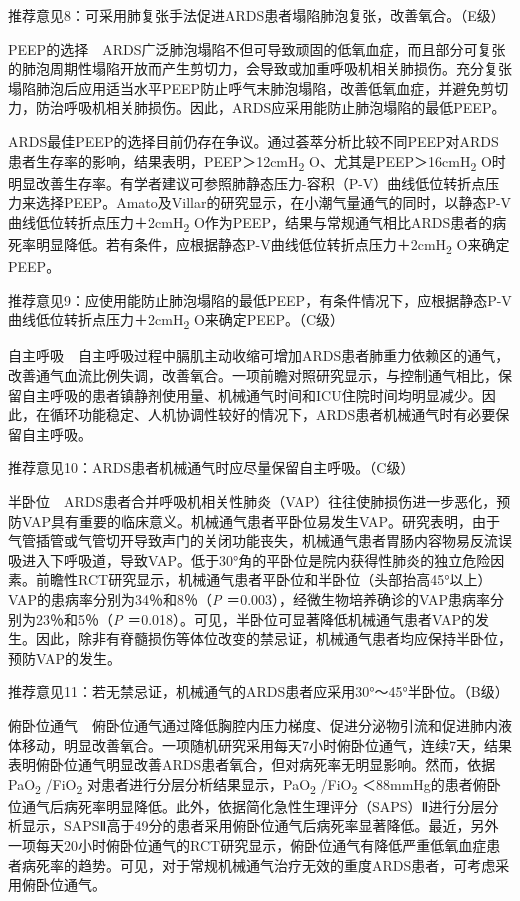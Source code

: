 推荐意见8：可采用肺复张手法促进ARDS患者塌陷肺泡复张，改善氧合。（E级）

PEEP的选择　ARDS广泛肺泡塌陷不但可导致顽固的低氧血症，而且部分可复张的肺泡周期性塌陷开放而产生剪切力，会导致或加重呼吸机相关肺损伤。充分复张塌陷肺泡后应用适当水平PEEP防止呼气末肺泡塌陷，改善低氧血症，并避免剪切力，防治呼吸机相关肺损伤。因此，ARDS应采用能防止肺泡塌陷的最低PEEP。

ARDS最佳PEEP的选择目前仍存在争议。通过荟萃分析比较不同PEEP对ARDS患者生存率的影响，结果表明，PEEP＞12cmH\textsubscript{2}
O、尤其是PEEP＞16cmH\textsubscript{2}
O时明显改善生存率。有学者建议可参照肺静态压力-容积（P-V）曲线低位转折点压力来选择PEEP。Amato及Villar的研究显示，在小潮气量通气的同时，以静态P-V曲线低位转折点压力＋2cmH\textsubscript{2}
O作为PEEP，结果与常规通气相比ARDS患者的病死率明显降低。若有条件，应根据静态P-V曲线低位转折点压力＋2cmH\textsubscript{2}
O来确定PEEP。

推荐意见9：应使用能防止肺泡塌陷的最低PEEP，有条件情况下，应根据静态P-V曲线低位转折点压力＋2cmH\textsubscript{2}
O来确定PEEP。（C级）

自主呼吸　自主呼吸过程中膈肌主动收缩可增加ARDS患者肺重力依赖区的通气，改善通气血流比例失调，改善氧合。一项前瞻对照研究显示，与控制通气相比，保留自主呼吸的患者镇静剂使用量、机械通气时间和ICU住院时间均明显减少。因此，在循环功能稳定、人机协调性较好的情况下，ARDS患者机械通气时有必要保留自主呼吸。

推荐意见10：ARDS患者机械通气时应尽量保留自主呼吸。（C级）

半卧位　ARDS患者合并呼吸机相关性肺炎（VAP）往往使肺损伤进一步恶化，预防VAP具有重要的临床意义。机械通气患者平卧位易发生VAP。研究表明，由于气管插管或气管切开导致声门的关闭功能丧失，机械通气患者胃肠内容物易反流误吸进入下呼吸道，导致VAP。低于30°角的平卧位是院内获得性肺炎的独立危险因素。前瞻性RCT研究显示，机械通气患者平卧位和半卧位（头部抬高45°以上）VAP的患病率分别为34％和8％（\emph{P}
＝0.003），经微生物培养确诊的VAP患病率分别为23％和5％（\emph{P}
＝0.018）。可见，半卧位可显著降低机械通气患者VAP的发生。因此，除非有脊髓损伤等体位改变的禁忌证，机械通气患者均应保持半卧位，预防VAP的发生。

推荐意见11：若无禁忌证，机械通气的ARDS患者应采用30°～45°半卧位。（B级）

俯卧位通气　俯卧位通气通过降低胸腔内压力梯度、促进分泌物引流和促进肺内液体移动，明显改善氧合。一项随机研究采用每天7小时俯卧位通气，连续7天，结果表明俯卧位通气明显改善ARDS患者氧合，但对病死率无明显影响。然而，依据PaO\textsubscript{2}
/FiO\textsubscript{2} 对患者进行分层分析结果显示，PaO\textsubscript{2}
/FiO\textsubscript{2}
＜88mmHg的患者俯卧位通气后病死率明显降低。此外，依据简化急性生理评分（SAPS）Ⅱ进行分层分析显示，SAPSⅡ高于49分的患者采用俯卧位通气后病死率显著降低。最近，另外一项每天20小时俯卧位通气的RCT研究显示，俯卧位通气有降低严重低氧血症患者病死率的趋势。可见，对于常规机械通气治疗无效的重度ARDS患者，可考虑采用俯卧位通气。

